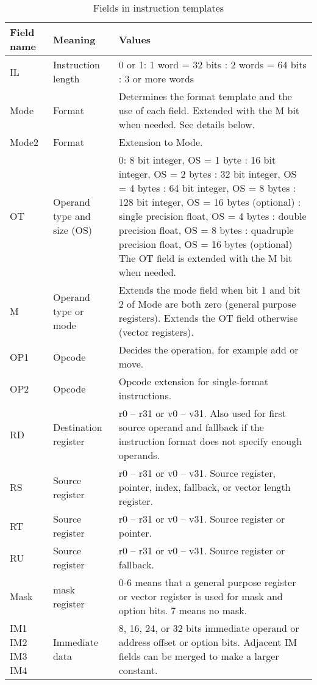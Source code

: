 \documentclass[forwardcom.tex]{subfiles}
\begin{document}
\begin{longtable} {|p{16mm}|p{16mm}|p{85mm}|}
\caption{Fields in instruction templates} \label{table:fieldsInTemplates} \\
\endfirsthead
\endhead
\hline
Field name & Meaning & Values  \\
\hline
IL & Instruction length & 0 or 1: 1 word = 32 bits \newline
2: 2 words = 64 bits \newline
3: 3 or more words  \\
\hline
Mode & Format & Determines the format template and the use of each field. 
Extended with the M bit when needed. \newline 
See details below. \\
\hline
Mode2 & Format & Extension to Mode. \\
\hline
OT & Operand type and size (OS) & 
0: 8 bit integer, OS = 1 byte  \newline
1: 16 bit integer, OS = 2 bytes \newline
2: 32 bit integer, OS = 4 bytes \newline
3: 64 bit integer, OS = 8 bytes \newline
4: 128 bit integer, OS = 16 bytes (optional) \newline
5: single precision float, OS = 4 bytes \newline
6: double precision float, OS = 8 bytes \newline
7: quadruple precision float, OS = 16 bytes (optional) \newline
The OT field is extended with the M bit when needed. \\
\hline
M & Operand type or mode & Extends the mode field when bit 1 and bit 2 of Mode are both zero (general purpose registers). Extends the OT field otherwise (vector registers).  \\
\hline
OP1 & Opcode & Decides the operation, for example add or move.  \\
\hline
OP2 & Opcode & Opcode extension for single-format instructions. \\
\hline
RD & Destination register & r0 – r31 or v0 – v31. Also used for first source operand and fallback if the instruction format does not specify enough operands. \\
\hline
RS & Source register & r0 – r31 or v0 – v31. Source register, pointer, index, fallback, or vector length register. \\
\hline
RT & Source register & r0 – r31 or v0 – v31. Source register or pointer.  \\
\hline
RU & Source register & r0 – r31 or v0 – v31. Source register or fallback. \\
\hline
Mask & mask register & 0-6 means that a general purpose register or vector register is used for mask and option bits. 7 means no mask.  \\
\hline
IM1 IM2 IM3 IM4 & Immediate data & 8, 16, 24, or 32 bits immediate operand or address offset or option bits. Adjacent IM fields can be merged to make a larger constant. \\
\hline
\end{longtable}
\vspace{2mm}
\end{document}
